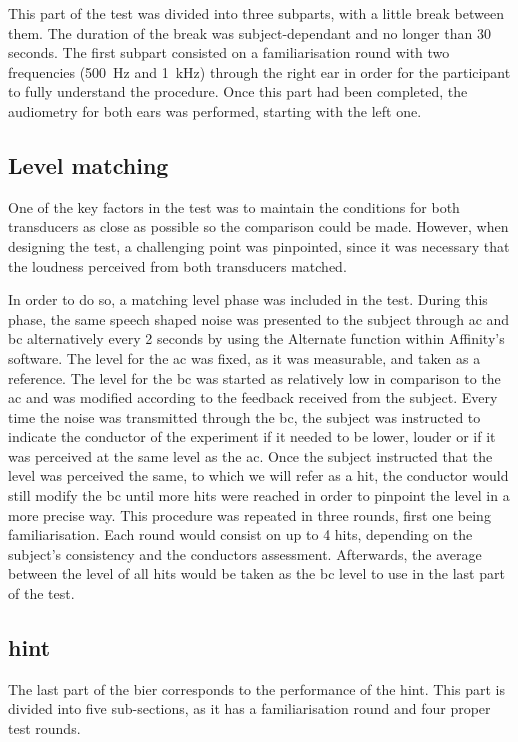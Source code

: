 This part of the test was divided into three subparts, with a little break between them. The duration of the break was subject-dependant and no longer than 30 seconds.
The first subpart consisted on a familiarisation round with two frequencies (\SI{500}{\hertz} and \SI{1}{\kilo\hertz}) through the right ear in order for the participant to fully understand the procedure. Once this part had been completed, the audiometry for both ears was performed, starting with the left one.

\subsection{Level matching}
One of the key factors in the test was to maintain the conditions for both transducers as close as possible so the comparison could be made. However, when designing the test, a challenging point was pinpointed, since it was necessary that the loudness perceived from both transducers matched.

In order to do so, a matching level phase was included in the test. During this phase, the same speech shaped noise was presented to the subject through \gls{ac} and \gls{bc} alternatively every 2 seconds by using the Alternate function within Affinity's software. The level for the \gls{ac} was fixed, as it was measurable, and taken as a reference. The level for the \gls{bc} was started as relatively low in comparison to the \gls{ac} and was modified according to the feedback received from the subject. Every time the noise was transmitted through the \gls{bc}, the subject was instructed to indicate the conductor of the experiment if it needed to be lower, louder or if it was perceived at the same level as the \gls{ac}. Once the subject instructed that the level was perceived the same, to which we will refer as a hit, the conductor would still modify the \gls{bc} until more hits were reached in order to pinpoint the level in a more precise way.
This procedure was repeated in three rounds, first one being familiarisation. Each round would consist on up to 4 hits, depending on the subject's consistency and the conductors assessment. Afterwards, the average between the level of all hits would be taken as the \gls{bc} level to use in the last part of the test.


\subsection{\gls{hint}}
The last part of the \gls{bier} corresponds to the performance of the \gls{hint}. This part is divided into five sub-sections, as it has a familiarisation round and four proper test rounds.

